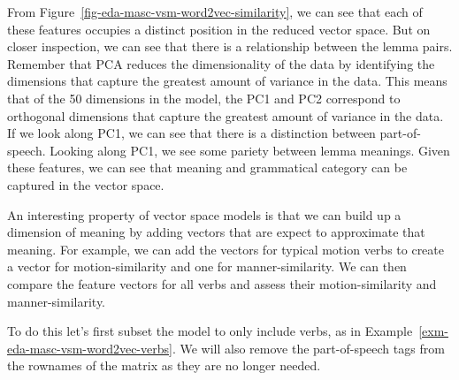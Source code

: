 \documentclass[
  letterpaper,
  DIV=11,
  numbers=noendperiod]{scrreport}
\theoremstyle{definition}
\theoremstyle{remark}
\begin{document}
From Figure~\ref{fig-eda-masc-vsm-word2vec-similarity}, we can see that
each of these features occupies a distinct position in the reduced
vector space. But on closer inspection, we can see that there is a
relationship between the lemma pairs. Remember that PCA reduces the
dimensionality of the data by identifying the dimensions that capture
the greatest amount of variance in the data. This means that of the 50
dimensions in the model, the PC1 and PC2 correspond to orthogonal
dimensions that capture the greatest amount of variance in the data. If
we look along PC1, we can see that there is a distinction between
part-of-speech. Looking along PC1, we see some pariety between lemma
meanings. Given these features, we can see that meaning and grammatical
category can be captured in the vector space.

An interesting property of vector space models is that we can build up a
dimension of meaning by adding vectors that are expect to approximate
that meaning. For example, we can add the vectors for typical motion
verbs to create a vector for motion-similarity and one for
manner-similarity. We can then compare the feature vectors for all verbs
and assess their motion-similarity and manner-similarity.

To do this let's first subset the model to only include verbs, as in
Example~\ref{exm-eda-masc-vsm-word2vec-verbs}. We will also remove the
part-of-speech tags from the rownames of the matrix as they are no
longer needed.
\end{document}
